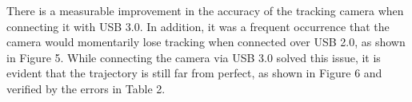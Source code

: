 \documentclass{article}
\begin{document}
\begin{table}[h] %
\noindent{}
\end{table}

\begin{table}[h] %
\noindent{}

\caption{Tracking accuracy and closed loop drift of the T265 measured on a square trajectory.}
\end{table}

There is a measurable improvement in the accuracy of the tracking camera when connecting it with USB 3.0. In addition, it was a frequent occurrence that the camera would momentarily lose tracking when connected over USB 2.0, as shown in Figure 5. While connecting the camera via USB 3.0 solved this issue, it is evident that the trajectory is still far from perfect, as shown in Figure 6 and verified by the errors in Table 2.
\end{document}
